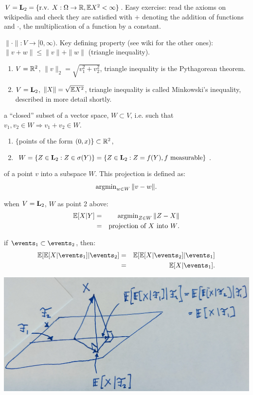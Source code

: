 \documentclass{article}
\begin{document}
 $V = \mathbf L_2 = \{\text{r.v. }X: \Omega \to {\mathbb R}, {\mathbb E} X^2 < \infty\}$. Easy exercise: read the axioms on wikipedia and check they are satisfied with $+$ denoting the addition of functions and $\cdot$, the multiplication of a function by a constant.


 $\|\cdot\| : V \to [0, \infty)$. Key defining property (see wiki for the other ones): $\|v + w\| \le \|v\| + \|w\|$ (triangle inequality).

\begin{enumerate}
  \item $V = {\mathbb R}^2$, $\|v\|_2 = \sqrt{v_1^2 + v_2^2}$, triangle inequality is the Pythagorean theorem.
  \item $V = \mathbf L_2$, $\|X\| = \sqrt{{\mathbb E} X^2 }$, triangle inequality is called Minkowski's inequality, described in more detail shortly.
\end{enumerate}

 a ``closed'' subset of a vector space, $W \subset V$, i.e. such that $v_1, v_2 \in W \Rightarrow v_1 + v_2 \in W$. 

\begin{enumerate}
  \item $\{$points of the form $(0, x)\} \subset {\mathbb R}^2$,
  \item $W = \{Z \in \mathbf L_2 : Z \in \sigma(Y)\} = \{Z \in \mathbf L_2 : Z = f(Y), f\text{ measurable}\}$. 
\end{enumerate}

 of a point $v$ into a subspace $W$. This projection is defined as:
\[ \operatorname{argmin}_{w \in W} \| v - w\|. \]

 when $V = \mathbf L_2$, $W$ as point 2 above:
\begin{eqnarray*}
{\mathbb E}[X|Y] &=& \operatorname{argmin}_{Z \in W} \| Z - X \| \\
&=& \text{projection of $X$ into $W$.}
\end{eqnarray*}

 if $\events_1 \subset \events_2$, then:
\begin{eqnarray*}
\E[\E[X|\events_1]|\events_2] &=& \E[\E[X|\events_2]|\events_1] \\
&=& \E[X | \events_1].
\end{eqnarray*}

\begin{center}
	\includegraphics[width=0.6\linewidth]{figures/tower} 
\end{center}
\end{document}
